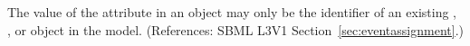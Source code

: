 The value of the attribute  in an \EventAssignment object
may only be the identifier of an existing \Compartment, \Species,
\Parameter or \SpeciesReference object in the model.  (References: SBML
L3V1 Section~\ref{sec:eventassignment}.)
